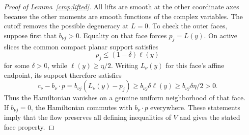 \begin{proof}[Proof of Lemma~\ref{cmp:lifted}]
All lifts are smooth at the other coordinate axes because
the other moments are smooth functions of the complex variables.
The cutoff removes the possible degeneracy at \(L=0\).
To check the outer faces, suppose first that \(b_{\nu j}>0\).
Equality on that face forces \(p_j=L(y)\). On active slices the
common compact planar support satisfies
\[
 p_j\le(1-\delta)\ell(y)
\]
for some \(\delta>0\), while \(\ell(y)\ge\eta/2\).
Writing \(L_\nu(y)\) for this face's affine endpoint, its support
therefore satisfies
\[
 c_\nu-b_\nu\cdot p
 =b_{\nu j}(L_\nu(y)-p_j)
 \ge b_{\nu j}\delta\ell(y)
 \ge b_{\nu j}\delta\eta/2>0.
\]
Thus the Hamiltonian vanishes on a genuine uniform neighborhood
of that face. If \(b_{\nu j}=0\), the Hamiltonian commutes with
\(b_\nu\cdot p\) everywhere. These statements imply that the
flow preserves all defining inequalities of \(V\) and gives
the stated face property.
\end{proof}
